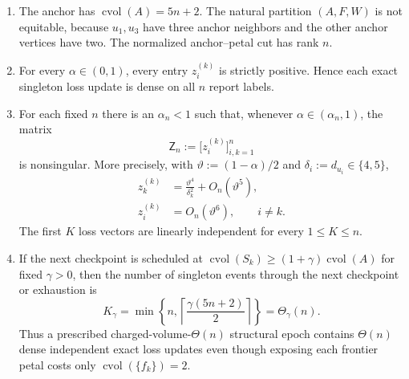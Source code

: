 \begin{proposition}
\begin{enumerate}[label=(\roman*)]
\item The anchor has
      $\operatorname{cvol}(A)=5n+2$.  The natural partition $(A,F,W)$ is
      not equitable, because $u_1,u_3$ have three anchor neighbors and the
      other anchor vertices have two.  The normalized anchor--petal cut has
      rank $n$.
\item For every $\alpha\in(0,1)$, every entry $z_i^{(k)}$ is strictly
      positive.  Hence each exact singleton loss update is dense on all $n$
      report labels.
\item For each fixed $n$ there is an $\alpha_n<1$ such that, whenever
      $\alpha\in(\alpha_n,1)$, the matrix
      \begin{equation*}
       \mathsf Z_n:=\bigl[z_i^{(k)}\bigr]_{i,k=1}^n
      \end{equation*}
      is nonsingular.  More precisely, with
      $\vartheta:=(1-\alpha)/2$ and
      $\delta_i:=d_{u_i}\in\{4,5\}$,
      \begin{align}
       z_k^{(k)}
       &=\frac{\vartheta^4}{\delta_k^2}
         +O_n(\vartheta^5),
       \label{eq:notched-sun-loss-diagonal}\\
       z_i^{(k)}&=O_n(\vartheta^6),
       \qquad i\neq k.
       \label{eq:notched-sun-loss-offdiagonal}
      \end{align}
      The first $K$ loss vectors are linearly independent for every
      $1\leq K\leq n$.
\item If the next checkpoint is scheduled at
      $\operatorname{cvol}(S_k)\geq
       (1+\gamma)\operatorname{cvol}(A)$ for fixed $\gamma>0$, then the
      number of singleton events through the next checkpoint or exhaustion
      is
      \begin{equation}
       K_\gamma
       =\min\!\left\{n,
          \left\lceil\frac{\gamma(5n+2)}2\right\rceil
        \right\}
       =\Theta_\gamma(n).
       \label{eq:notched-sun-light-epoch-length}
      \end{equation}
      Thus a prescribed charged-volume-$\Theta(n)$ structural epoch contains
      $\Theta(n)$ dense independent exact loss updates even though exposing
      each frontier petal costs only $\operatorname{cvol}(\{f_k\})=2$.
\end{enumerate}
\end{proposition}

